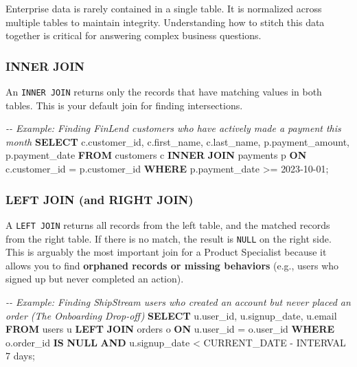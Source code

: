 \documentclass[
  11pt,
  openany,
  oneside]{book}
\newenvironment{Shaded}{}{}
\newcommand{\CommentTok}[1]{\textcolor[rgb]{0.38,0.63,0.69}{\textit{#1}}}
\newcommand{\DataTypeTok}[1]{\textcolor[rgb]{0.56,0.13,0.00}{#1}}
\newcommand{\FunctionTok}[1]{\textcolor[rgb]{0.02,0.16,0.49}{#1}}
\newcommand{\KeywordTok}[1]{\textcolor[rgb]{0.00,0.44,0.13}{\textbf{#1}}}
\newcommand{\NormalTok}[1]{#1}
\newcommand{\OperatorTok}[1]{\textcolor[rgb]{0.40,0.40,0.40}{#1}}
\newcommand{\StringTok}[1]{\textcolor[rgb]{0.25,0.44,0.63}{#1}}
\begin{document}
Enterprise data is rarely contained in a single table. It is normalized
across multiple tables to maintain integrity. Understanding how to
stitch this data together is critical for answering complex business
questions.

\subsubsection{INNER JOIN}\label{inner-join}

An \texttt{INNER\ JOIN} returns only the records that have matching
values in both tables. This is your default join for finding
intersections.

\begin{Shaded}
\begin{Highlighting}[]
\CommentTok{{-}{-} Example: Finding FinLend customers who have actively made a payment this month}
\KeywordTok{SELECT} 
\NormalTok{    c.customer\_id, }
\NormalTok{    c.first\_name, }
\NormalTok{    c.last\_name, }
\NormalTok{    p.payment\_amount, }
\NormalTok{    p.payment\_date}
\KeywordTok{FROM}\NormalTok{ customers c}
\KeywordTok{INNER} \KeywordTok{JOIN}\NormalTok{ payments p }\KeywordTok{ON}\NormalTok{ c.customer\_id }\OperatorTok{=}\NormalTok{ p.customer\_id}
\KeywordTok{WHERE}\NormalTok{ p.payment\_date }\OperatorTok{\textgreater{}=} \StringTok{\textquotesingle{}2023{-}10{-}01\textquotesingle{}}\NormalTok{;}
\end{Highlighting}
\end{Shaded}

\subsubsection{LEFT JOIN (and RIGHT
JOIN)}\label{left-join-and-right-join}

A \texttt{LEFT\ JOIN} returns all records from the left table, and the
matched records from the right table. If there is no match, the result
is \texttt{NULL} on the right side. This is arguably the most important
join for a Product Specialist because it allows you to find
\textbf{orphaned records or missing behaviors} (e.g., users who signed
up but never completed an action).

\begin{Shaded}
\begin{Highlighting}[]
\CommentTok{{-}{-} Example: Finding ShipStream users who created an account but never placed an order (The Onboarding Drop{-}off)}
\KeywordTok{SELECT} 
\NormalTok{    u.user\_id, }
\NormalTok{    u.signup\_date, }
\NormalTok{    u.email}
\KeywordTok{FROM}\NormalTok{ users u}
\KeywordTok{LEFT} \KeywordTok{JOIN}\NormalTok{ orders o }\KeywordTok{ON}\NormalTok{ u.user\_id }\OperatorTok{=}\NormalTok{ o.user\_id}
\KeywordTok{WHERE}\NormalTok{ o.order\_id }\KeywordTok{IS} \KeywordTok{NULL} 
  \KeywordTok{AND}\NormalTok{ u.signup\_date }\OperatorTok{\textless{}} \FunctionTok{CURRENT\_DATE} \OperatorTok{{-}} \DataTypeTok{INTERVAL} \StringTok{\textquotesingle{}7 days\textquotesingle{}}\NormalTok{;}
\end{Highlighting}
\end{Shaded}
\end{document}
